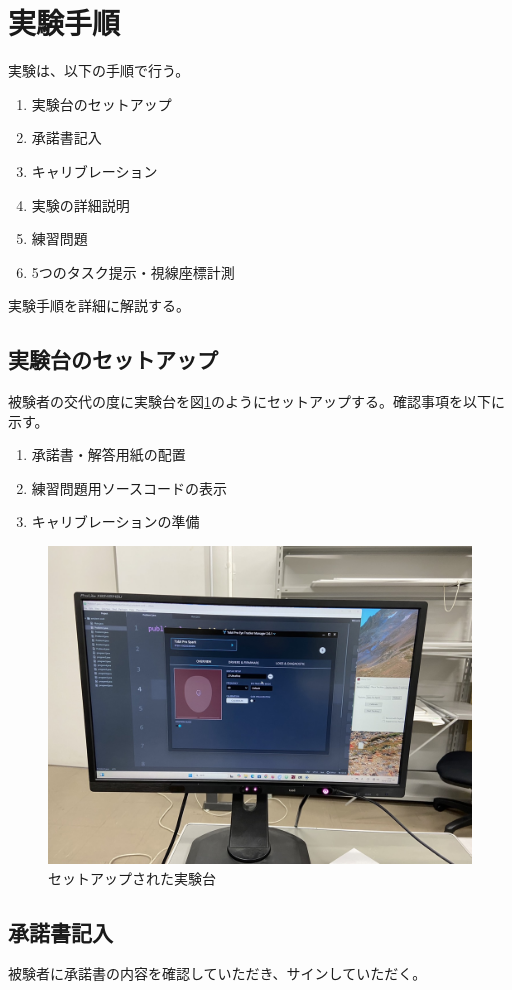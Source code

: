 \documentclass[paper=a4paper,fontsize=11pt]{jlreq}
\begin{document}
  \section{実験手順}
    実験は、以下の手順で行う。
    \begin{enumerate}
      \item 実験台のセットアップ
      \item 承諾書記入
      \item キャリブレーション
      \item 実験の詳細説明
      \item 練習問題
      \item 5つのタスク提示・視線座標計測
    \end{enumerate}
    実験手順を詳細に解説する。

    \subsection{実験台のセットアップ}
      被験者の交代の度に実験台を図\ref{実験台}のようにセットアップする。確認事項を以下に示す。
      \begin{enumerate}
        \item 承諾書・解答用紙の配置
        \item 練習問題用ソースコードの表示
        \item キャリブレーションの準備
      \end{enumerate}

      \begin{figure}[h]
        \centering
        \includegraphics[height=0.5\linewidth]{実験台.jpg}
        \caption{セットアップされた実験台}
        \label{実験台}
      \end{figure}
    
    \subsection{承諾書記入}
      被験者に承諾書の内容を確認していただき、サインしていただく。
    
\end{document}
